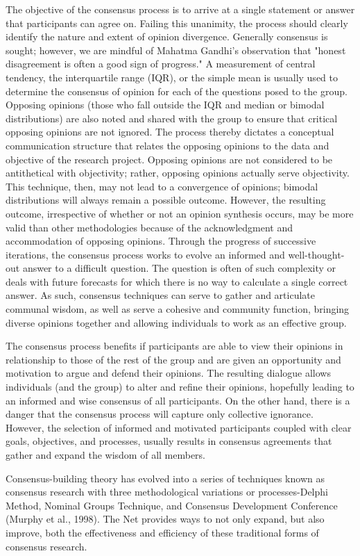 \documentclass [8pt]{beamer}
\begin{document}
\begin{frame}
\justifying	
The objective of the consensus process is to arrive at a single statement or answer that participants can agree on. Failing this unanimity, the process should clearly identify the nature and extent of opinion divergence. Generally consensus is sought; however, we are mindful of Mahatma Gandhi's observation that "honest disagreement is often a good sign of progress." A measurement of central tendency, the interquartile range (IQR), or the simple mean is usually used to determine the consensus of opinion for each of the questions posed to the group. Opposing opinions (those who fall outside
the IQR and median or bimodal distributions) are also noted and shared with the group to ensure that critical opposing opinions are not ignored. The process thereby dictates a conceptual communication structure that relates the opposing opinions to the data and objective of the research project. Opposing opinions are not considered to be antithetical with objectivity; rather, opposing opinions actually serve objectivity. This technique, then, may not lead to a convergence of opinions; bimodal distributions will always remain a possible outcome. However, the resulting outcome, irrespective of whether or not an opinion synthesis occurs, may be more valid than other methodologies because of the acknowledgment and accommodation of opposing opinions. Through the progress of successive iterations, the consensus process works to evolve an informed and well-thought-out answer to a difficult question. The question is often of such complexity or deals with future forecasts for which there is no way to calculate a single correct answer. As such, consensus techniques can serve to gather and articulate communal wisdom, as well as serve a cohesive and community function, bringing diverse opinions together and allowing individuals to work as an effective group.

The consensus process benefits if participants are able to view their opinions in relationship to those of the rest of the group and are given an opportunity and motivation to argue and defend their opinions. The resulting dialogue allows individuals (and the group) to alter and refine their opinions, hopefully leading to an informed and wise consensus of all participants. On the other hand, there is a danger that the consensus process will capture only collective ignorance. However, the selection of informed and motivated participants coupled with clear goals, objectives, and processes, usually results in consensus agreements that gather and expand the wisdom of all members.

Consensus-building theory has evolved into a series of techniques known as consensus research with three methodological variations or processes-Delphi Method, Nominal Groups Technique, and Consensus Development Conference (Murphy et al., 1998). The Net provides ways to not only expand, but also improve, both the effectiveness and efficiency of these traditional forms of consensus research.
\end{frame}
\end{document}
